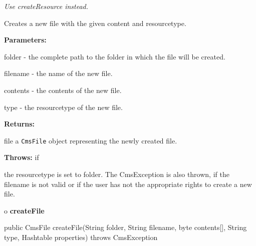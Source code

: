 \begin{description}
 {\it Use createResource
instead.} 

Creates a new file with the given content and resourcetype.\htmlBR

\begin{description}
\item {\bf Parameters:}  

folder - the complete path to the folder in which the file will be created.  

filename - the name of the new file.  

contents - the contents of the new file.  

type - the resourcetype of the new file.  
\item {\bf Returns:}  

file a {\tt CmsFile} object representing the newly created file.  
\item {\bf Throws:} if  

the resourcetype is set to folder. The CmsException is also thrown, if the
filename is not valid or if the user has not the appropriate rights to create
a new file.  
\end{description}

\end{description}

o {\bf createFile} 

\begin{PRE}
 public CmsFile createFile(String folder,
                           String filename,
                           byte contents[],
                           String type,
                           Hashtable properties) throws CmsException
\end{PRE}

